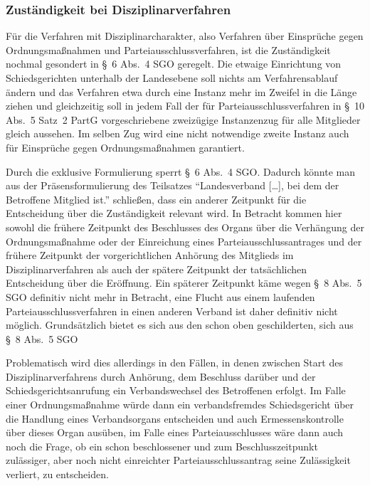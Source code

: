 \subsubsection{Zuständigkeit bei Disziplinarverfahren}
\label{Standardworkflow:Zustaendigkeit:Disziplinarverfahren}
Für die Verfahren mit Disziplinarcharakter, also Verfahren über Einsprüche gegen Ordnungsmaßnahmen und Parteiausschlussverfahren, ist die Zuständigkeit nochmal gesondert in \S~6 Abs.~4 SGO geregelt.
Die etwaige Einrichtung von Schiedsgerichten unterhalb der Landesebene soll nichts am Verfahrensablauf ändern und das Verfahren etwa durch eine Instanz mehr im Zweifel in die Länge ziehen und gleichzeitig soll in jedem Fall der für Parteiausschlussverfahren in \S~10 Abs.~5 Satz~2 PartG vorgeschriebene zweizügige Instanzenzug für alle Mitglieder gleich aussehen. Im selben Zug wird eine nicht notwendige zweite Instanz auch für Einsprüche gegen Ordnungsmaßnahmen garantiert.

Durch die exklusive Formulierung sperrt \S~6 Abs.~4 SGO.
Dadurch könnte man aus der Präsensformulierung des Teilsatzes \enquote{Landesverband […], bei dem der Betroffene Mitglied ist.} schließen, dass ein anderer Zeitpunkt für die Entscheidung über die Zuständigkeit relevant wird.
In Betracht kommen hier sowohl die frühere Zeitpunkt des Beschlusses des Organs über die Verhängung der Ordnungsmaßnahme oder der Einreichung eines Parteiausschlussantrages und der frühere Zeitpunkt der vorgerichtlichen Anhörung des Mitglieds im Disziplinarverfahren als auch der spätere Zeitpunkt der tatsächlichen Entscheidung über die Eröffnung.
Ein späterer Zeitpunkt käme wegen \S~8 Abs.~5 SGO definitiv nicht mehr in Betracht, eine Flucht aus einem laufenden Parteiausschlussverfahren in einen anderen Verband ist daher definitiv nicht möglich.
Grundsätzlich bietet es sich aus den schon oben geschilderten, sich aus \S~8 Abs.~5 SGO

Problematisch wird dies allerdings in den Fällen, in denen zwischen Start des Disziplinarverfahrens durch Anhörung, dem Beschluss darüber und der Schiedsgerichtsanrufung ein Verbandswechsel des Betroffenen erfolgt.
Im Falle einer Ordnungsmaßnahme würde dann ein verbandsfremdes Schiedsgericht über die Handlung eines Verbandsorgans entscheiden und auch Ermessenskontrolle über dieses Organ ausüben, im Falle eines Parteiausschlusses wäre dann auch noch die Frage, ob ein schon beschlossener und zum Beschlusszeitpunkt zulässiger, aber noch nicht einreichter Parteiausschlussantrag seine Zulässigkeit verliert, zu entscheiden.

